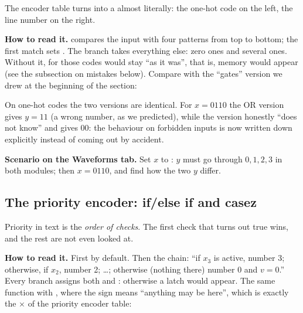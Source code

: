 The encoder table turns into a  almost literally: the one-hot
code on the left, the line number on the right.


\textbf{How to read it.}  compares the input with four
patterns from top to bottom; the first match sets . The 
branch takes everything else: zero ones and several ones. Without it, for
those codes  would stay ``as it was'', that is, memory would appear
(see the subsection on mistakes below). Compare with the ``gates'' version
we drew at the beginning of the section:


On one-hot codes the two versions are identical. For $x=0110$ the OR version
gives $y=11$ (a wrong number, as we predicted), while the 
version honestly ``does not know'' and gives $00$: the behaviour on
forbidden inputs is now written down explicitly instead of coming out by accident.


\textbf{Scenario on the Waveforms tab.} Set $x$ to
: $y$ must go through $0,1,2,3$ in both modules;
then $x=0110$, and find how the two $y$ differ.

\subsection{The priority encoder: if/else if and casez}

Priority in text is the \emph{order of checks}. The first check that turns out
true wins, and the rest are not even looked at.


\textbf{How to read it.} First  by default. Then the chain:
``if $x_3$ is active, number 3; otherwise, if $x_2$, number 2; \ldots;
otherwise (nothing there) number 0 and $v=0$.'' Every branch assigns both 
and : otherwise a latch would appear. The same function with
, where the sign  means ``anything may be here'', which
is exactly the $\times$ of the priority encoder table:



